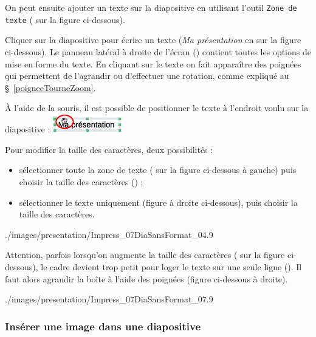 On peut ensuite ajouter un texte sur la diapositive en utilisant l'outil \texttt{Zone de texte} ( sur la figure ci-dessous).


Cliquer sur la diapositive pour écrire un texte (\emph{\og Ma présentation \fg} en  sur la figure ci-dessous). Le panneau latéral à droite de l'écran () contient toutes les options de mise en forme du texte. En cliquant sur le texte on fait apparaître des poignées qui permettent de l'agrandir ou d'effectuer une rotation, comme expliqué au \S\ \vref{poigneeTourneZoom}. 

\vspace{1em}

À l'aide de la souris, il est possible de positionner le texte à l'endroit voulu sur la diapositive : \includegraphics[angle=0,width=3cm]{./images/presentation/Impress_07DiaSansFormat_05}

\vspace{1em}

Pour modifier la taille des caractères, deux possibilités :
\begin{itemize}
\item sélectionner toute la zone de texte ( sur la figure ci-dessous à gauche) puis choisir la taille des caractères () ; 
\item sélectionner le texte uniquement (figure à droite ci-dessous), puis choisir la taille des caractères.
\end{itemize}

	      {./images/presentation/Impress_07DiaSansFormat_04}{.9\textwidth}

Attention, parfois lorsqu'on augmente la taille des caractères ( sur la figure ci-dessous), le cadre devient trop petit pour loger le texte sur une seule ligne (). Il faut alors agrandir la boîte à l'aide des poignées (figure ci-dessous à droite).

	      {./images/presentation/Impress_07DiaSansFormat_07}{.9\textwidth}


\subsubsection{Insérer une image dans une diapositive}\label{Presentation1image}


